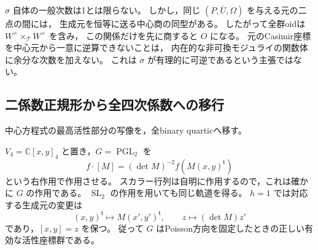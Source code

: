 \begin{remark}[元のCasimir座標の多価性]
$\sigma$ 自体の一般次数は1とは限らない。
しかし，同じ $(P,\overline U,\Omega)$ を与える元の二点の間には，
生成元を恒等に送る中心商の同型がある。
したがって全群oidは $W^\times\times_{\mathcal T}W^\times$ を含み，
この関係だけを先に商すると $O$ になる。
元のCasimir座標を中心元から一意に逆算できないことは，
内在的な非可換モジュライの関数体に余分な次数を加えない。
これは $\sigma$ が有理的に可逆であるという主張ではない。
\end{remark}

\subsection{二係数正規形から全四次係数への移行}
\label{subsec:binary-shadow-full-quartic-degree}

中心方程式の最高活性部分の写像を，全binary quarticへ移す。

$V_4=\mathbb C[x,y]_4$ と置き，$G=\operatorname{PGL}_2$ を
\[
 f\cdot[M]=(\det M)^{-2}f(M(x,y)^{\mathsf t})
\]
という右作用で作用させる。
スカラー行列は自明に作用するので，これは確かに $G$ の作用である。
$\operatorname{SL}_2$ の作用を用いても同じ軌道を得る。
$h=1$ では対応する生成元の変更は
\[
 (x,y)^{\mathsf t}\longmapsto M(x',y')^{\mathsf t},
 \qquad z\longmapsto(\det M)z'
\]
であり，$[x,y]=z$ を保つ。
従って $G$ はPoisson方向を固定したときの正しい有効な活性座標群である。

